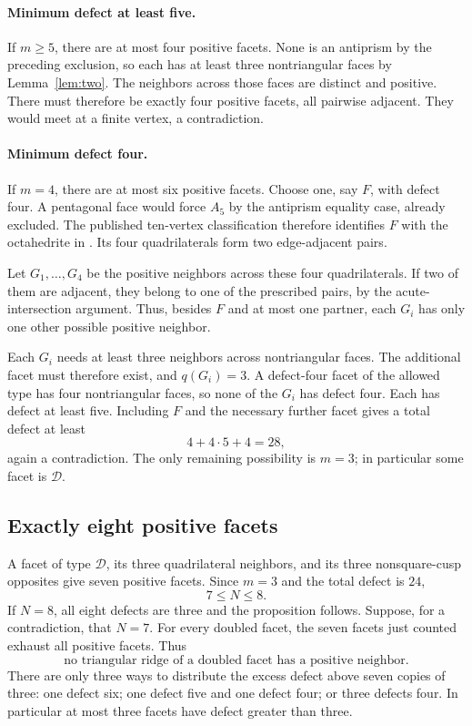 \documentclass[11pt]{article}
\theoremstyle{remark}
\newcommand{\DBL}{\mathcal D}
\begin{document}
\paragraph{Minimum defect at least five.}
If $m\ge5$, there are at most four positive facets. None is an
antiprism by the preceding exclusion, so each has at least three
nontriangular faces by Lemma~\ref{lem:two}. The neighbors across
those faces are distinct and positive. There must therefore be
exactly four positive facets, all pairwise adjacent. They would
meet at a finite vertex, a contradiction.

\paragraph{Minimum defect four.}
If $m=4$, there are at most six positive facets. Choose one,
say $F$, with defect four. A pentagonal face would force $A_5$ by
the antiprism equality case, already excluded. The published
ten-vertex classification therefore identifies $F$ with the
octahedrite in \cite[Figure~7]{Kolpakov}. Its four quadrilaterals
form two edge-adjacent pairs.

Let $G_1,\dots,G_4$ be the positive neighbors across these four
quadrilaterals. If two of them are adjacent, they belong to one of
the prescribed pairs, by the acute-intersection argument. Thus,
besides $F$ and at most one partner, each $G_i$ has only one other
possible positive neighbor.

Each $G_i$ needs at least three neighbors across nontriangular
faces. The additional facet must therefore exist, and $q(G_i)=3$.
A defect-four facet of the allowed type
has four nontriangular faces, so none of the $G_i$ has defect four.
Each has defect at least five. Including $F$ and the necessary
further facet gives a total defect at least
\[
 4+4\cdot5+4=28,
\]
again a contradiction. The only remaining possibility is $m=3$;
in particular some facet is $\DBL$.

\subsection{Exactly eight positive facets}\label{exactly-eight-positive-facets-all-d9}

A facet of type $\DBL$, its three quadrilateral neighbors, and its
three nonsquare-cusp opposites give seven positive facets. Since
$m=3$ and the total defect is $24$,
\[
 7\le N\le8.
\]
If $N=8$, all eight defects are three and the proposition follows.
Suppose, for a contradiction, that $N=7$. For every doubled facet,
the seven facets just counted exhaust all positive facets. Thus
\begin{equation}\label{eq:seven-triangular}
 \text{no triangular ridge of a doubled facet has a positive neighbor.}
\end{equation}
There are only three ways to distribute the excess defect above
seven copies of three: one defect six; one defect five and one
defect four; or three defects four. In particular at most three
facets have defect greater than three.
\end{document}
